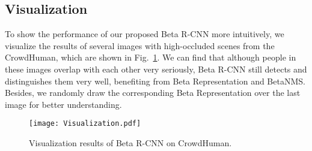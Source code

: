 \documentclass{article}
\begin{document}
\subsection{Visualization}
To show the performance of our proposed Beta R-CNN more intuitively, we visualize the results of several images with high-occluded scenes from the CrowdHuman, which are shown in Fig.~\ref{visualization}. 
We can find that although people in these images overlap with each other very seriously, Beta R-CNN still detects and distinguishes them very well, benefiting from Beta Representation and BetaNMS. Besides, we randomly draw the corresponding Beta Representation over the last image for better understanding. 

\begin{figure}[htbp!]
    \centering
    \texttt{[image: Visualization.pdf]}
    \caption{Visualization results of Beta R-CNN on CrowdHuman.}
    \label{visualization}
\end{figure}

\newpage

\small

\end{document}
